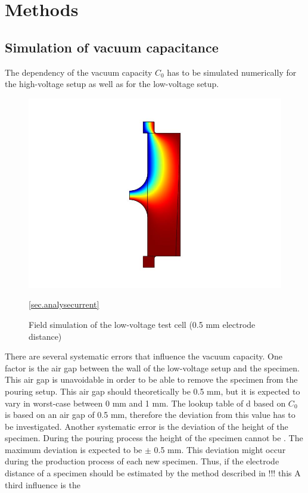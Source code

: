 \chapter{Methods}

\section{Simulation of vacuum capacitance} 
The dependency of the vacuum capacity $C_0$ has to be simulated numerically for the high-voltage setup as well as for the low-voltage setup. 
\begin{figure}[htbp]
	\centering
	\includegraphics{figures/COMSOL_Beispielbild.jpg}		
	\caption[Kurze Abbildungsbeschreibung]{Field simulation of the low-voltage test cell (0.5 mm electrode distance)} \ref{sec.analysecurrent}
	\label{fig.waveforms}
\end{figure}
 
There are several systematic errors that influence the vacuum capacity. One factor is the air gap between the wall of the low-voltage setup and the specimen. This air gap is unavoidable in order to be able to remove the specimen from the pouring setup. This air gap should theoretically be 0.5 mm, but it is expected to vary in worst-case between 0 mm and 1 mm. The lookup table of d based on $C_0$ is based on an air gap of 0.5 mm, therefore the deviation from this value has to be investigated. 
Another systematic error is the deviation of the height of the specimen. During  the pouring process the height of the specimen cannot be . The maximum deviation is expected to be $\pm$ 0.5 mm. This deviation might occur during the production process of each new specimen. Thus, if the electrode distance of a specimen should be estimated by the method described in !!! this 
A third influence is the 



